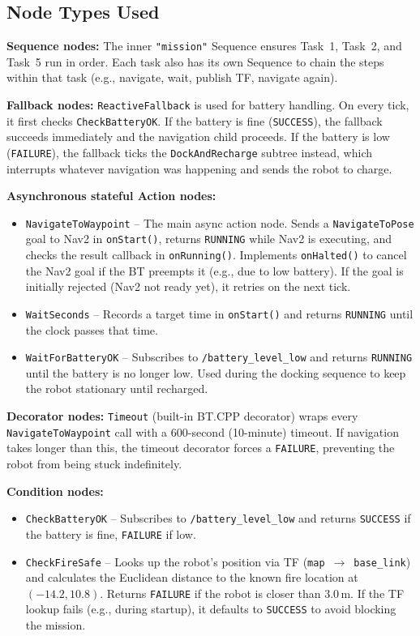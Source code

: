\documentclass[12pt, a4paper]{article}
\begin{document}
\subsection{Node Types Used}

\textbf{Sequence nodes:}
The inner \texttt{"mission"} Sequence ensures Task~1, Task~2, and Task~5 run in order. Each task also has its own Sequence to chain the steps within that task (e.g., navigate, wait, publish TF, navigate again).

\textbf{Fallback nodes:}
\texttt{ReactiveFallback} is used for battery handling. On every tick, it first checks \texttt{CheckBatteryOK}. If the battery is fine (\texttt{SUCCESS}), the fallback succeeds immediately and the navigation child proceeds. If the battery is low (\texttt{FAILURE}), the fallback ticks the \texttt{DockAndRecharge} subtree instead, which interrupts whatever navigation was happening and sends the robot to charge.

\textbf{Asynchronous stateful Action nodes:}
\begin{itemize}
    \item \texttt{NavigateToWaypoint} -- The main async action node. Sends a \texttt{NavigateToPose} goal to Nav2 in \texttt{onStart()}, returns \texttt{RUNNING} while Nav2 is executing, and checks the result callback in \texttt{onRunning()}. Implements \texttt{onHalted()} to cancel the Nav2 goal if the BT preempts it (e.g., due to low battery). If the goal is initially rejected (Nav2 not ready yet), it retries on the next tick.
    \item \texttt{WaitSeconds} -- Records a target time in \texttt{onStart()} and returns \texttt{RUNNING} until the clock passes that time.
    \item \texttt{WaitForBatteryOK} -- Subscribes to \texttt{/battery\_level\_low} and returns \texttt{RUNNING} until the battery is no longer low. Used during the docking sequence to keep the robot stationary until recharged.
\end{itemize}

\textbf{Decorator nodes:}
\texttt{Timeout} (built-in BT.CPP decorator) wraps every \texttt{NavigateToWaypoint} call with a 600-second (10-minute) timeout. If navigation takes longer than this, the timeout decorator forces a \texttt{FAILURE}, preventing the robot from being stuck indefinitely.

\textbf{Condition nodes:}
\begin{itemize}
    \item \texttt{CheckBatteryOK} -- Subscribes to \texttt{/battery\_level\_low} and returns \texttt{SUCCESS} if the battery is fine, \texttt{FAILURE} if low.
    \item \texttt{CheckFireSafe} -- Looks up the robot's position via TF (\texttt{map}~$\rightarrow$~\texttt{base\_link}) and calculates the Euclidean distance to the known fire location at $(-14.2, 10.8)$. Returns \texttt{FAILURE} if the robot is closer than 3.0\,m. If the TF lookup fails (e.g., during startup), it defaults to \texttt{SUCCESS} to avoid blocking the mission.
\end{itemize}
\end{document}
